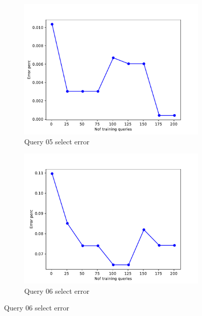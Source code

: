 \begin{figure}[!htb]
    \begin{subfigure}[t]{0.5\textwidth}
      \includegraphics[scale=0.4]{figs/tpch10/tpch10_sel05_error.pdf}
      \caption{Query 05 select error}
      \label{fig:tpch_sel05}
    \end{subfigure}
    \begin{subfigure}[t]{0.5\textwidth}
      \includegraphics[scale=0.4]{figs/tpch10/tpch10_sel06_error.pdf}
      \caption{Query 06 select error}
      \label{fig:tpch_sel06}
     \end{subfigure}


\end{figure}
